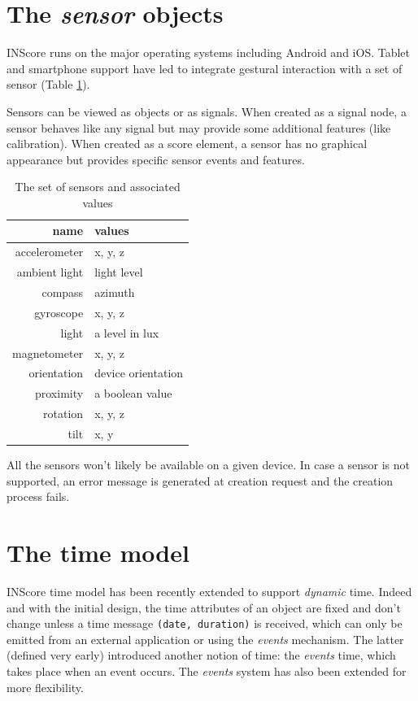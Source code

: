 \documentclass[11pt,a4paper]{article}
\newcommand{\OSC}[1]	{{\fontsize{10pt}{10pt} \selectfont\texttt{#1}}}
\begin{document}
\section{The \emph{sensor} objects}

INScore runs on the major operating systems including Android and iOS. Tablet and smartphone support have led to integrate gestural interaction with a set of sensor (Table \ref{tab:sensors}). 

Sensors can be viewed as objects or as signals. When created as a signal node, a sensor behaves like any signal but may provide some additional features (like calibration). When created as a score element, a sensor has no graphical appearance but provides specific sensor events and features.

\begin{table}[ht]
\begin{center}
\begin{tabular}{rl}
\hline
name & values \\
\hline
accelerometer	& x, y, z \\
ambient light	& light level \\
compass			& azimuth \\
gyroscope		& x, y, z \\
light			& a level in lux \\
magnetometer	& x, y, z \\
orientation		& device orientation \\
proximity		& a boolean value \\
rotation		& x, y, z \\
tilt			& x, y \\
\hline
\end{tabular}
\end{center}
\label{tab:sensors}
\caption{The set of sensors and associated values}
\end{table}

All the sensors won't likely be available on a given device. In case a sensor is not supported, an error message is generated at creation request and the creation process fails.



\section{The time model}

INScore time model has been recently extended to support \emph{dynamic} time. Indeed and with the initial design, the time attributes of an object are fixed and don't change unless a time message \OSC{(date, duration)} is received, which can only be emitted from an external application or using the \emph{events} mechanism. The latter (defined very early) introduced another notion of time: the \emph{events} time, which takes place when an event occurs.  The \emph{events} system has also been extended for more flexibility. 
\end{document}
